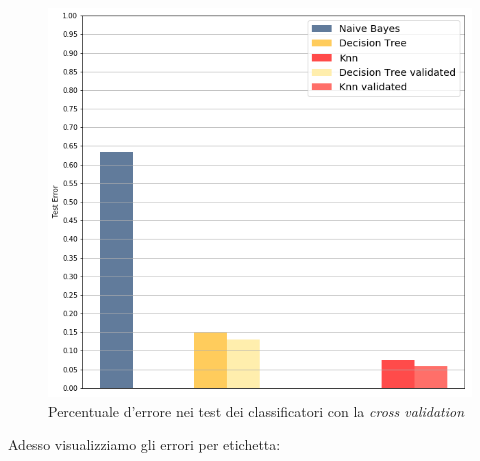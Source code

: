 \begin{figure}[H]
	\centering
	\includegraphics[width=1\linewidth]{img/test_errors_cross_validation}
	\caption{Percentuale d'errore nei test dei classificatori con la \textit{cross validation}}
	\label{fig:testerrorscrossvalidation}
\end{figure}

Adesso visualizziamo gli errori per etichetta:

